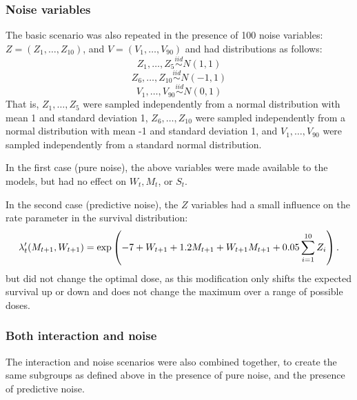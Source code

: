 \documentclass[12pt]{article}
\begin{document}

\subsubsection{Noise variables} %
\label{ssub:noise_variables}

The basic scenario was also repeated in the presence of 100 noise variables:
$Z = (Z_{1}, \ldots, Z_{10})$, and $V = (V_{1}, \ldots, V_{90})$ and had distributions as follows:
\begin{equation}
  Z_{1}, \ldots, Z_{5} \overset{iid}{\sim} N(1, 1)
\end{equation}
\begin{equation}
  Z_{6}, \ldots, Z_{10} \overset{iid}{\sim} N(-1, 1)
\end{equation}
\begin{equation}
  V_{1}, \ldots, V_{90} \overset{iid}{\sim} N(0, 1)
\end{equation}
That is, $Z_{1}, \ldots, Z_{5}$ were sampled independently from a normal distribution with mean 1 and standard deviation 1, $Z_{6}, \ldots, Z_{10}$ were sampled independently from a normal distribution with mean -1 and standard deviation 1, and $V_{1}, \ldots, V_{90}$ were sampled independently from a standard normal distribution.

In the first case (pure noise), the above variables were made available to the models, but had no effect on $W_{t}, M_{t}$, or $S_{t}$.

In the second case (predictive noise), the $Z$ variables had a small influence on the rate parameter in the survival distribution:
\begin{equation}
  \lambda'_{t}(M_{t+1}, W_{t+1}) = \exp\del{-7 + W_{t+1} + 1.2 M_{t+1} + W_{t+1} M_{t+1} + 0.05 \sum_{i = 1}^{10} Z_{i}}.
\end{equation}
but did not change the optimal dose, as this modification only shifts the expected survival up or down and does not change the maximum over a range of possible doses.


\subsubsection{Both interaction and noise} %
\label{ssub:subsubsection_name}

The interaction and noise scenarios were also combined together, to create the same subgroups as defined above in the presence of pure noise, and the presence of predictive noise.





\end{document}
